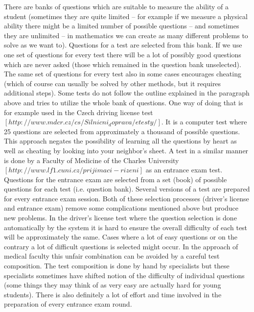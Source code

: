 There are banks of questions which are suitable to measure the ability of a student (sometimes they are quite limited – for example if we measure a physical ability there might be a limited number of possible questions – and sometimes they are unlimited – in mathematics we can create as many different problems to solve as we want to). Questions for a test are selected from this bank. If we use one set of questions for every test there will be a lot of possibly good questions which are never asked (those which remained in the question bank unselected). The same set of questions for every test also in some cases encourages cheating (which of course can usually be solved by other methods, but it requires additional steps). Some tests do not follow the outline explained in the paragraph above and tries to utilize the whole bank of questions. One way of doing that is for example used in the Czech driving license test $[http://www.mdcr.cz/cs/Silnicni_doprava/etesty/]$. It is a computer test where 25 questions are selected from approximately a thousand of possible questions. This approach negates the possibility of learning all the questions by heart as well as cheating by looking into your neighbor’s sheet. A test in a similar manner is done by a Faculty of Medicine of the Charles University $[http://www.lf1.cuni.cz/prijimaci-rizeni]$ as an entrance exam test. Questions for the entrance exam are selected from a set (book) of possible questions for each test (i.e. question bank). Several versions of a test are prepared for every entrance exam session. Both of these selection processes (driver’s license and entrance exam) remove some complications mentioned above but produce new problems. In the driver’s license test where the question selection is done automatically by the system it is hard to ensure the overall difficulty of each test will be approximately the same. Cases where a lot of easy questions or on the contrary a lot of difficult questions is selected might occur. In the approach of medical faculty this unfair combination can be avoided by a careful test composition. The test composition is done by hand by specialists but these specialists sometimes have shifted notion of the difficulty of individual questions (some things they may think of as very easy are actually hard for young students). There is also definitely a lot of effort and time involved in the preparation of every entrance exam round.

